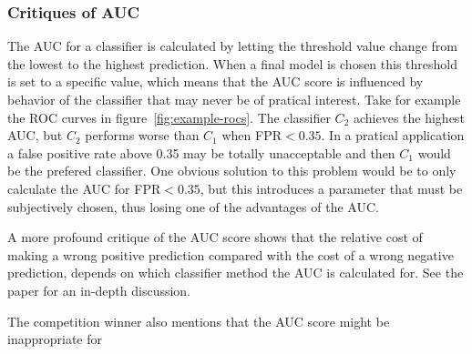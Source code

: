 \subsubsection{Critiques of AUC}\label{sec:auc-critique}
The AUC for a classifier is calculated by letting the threshold value change from the lowest to the highest prediction. When a final model is chosen this threshold is set to a specific value, which means that the AUC score is influenced by behavior of the classifier that may never be of pratical interest. Take for example the ROC curves in figure~\ref{fig:example-rocs}. The classifier $C_2$ achieves the highest AUC, but $C_2$ performs worse than $C_1$ when FPR$<0.35$. In a pratical application a false positive rate above 0.35 may be totally unacceptable and then $C_1$ would be the prefered classifier. One obvious solution to this problem would be to only calculate the AUC for FPR$<0.35$, but this introduces a parameter that must be subjectively chosen, thus losing one of the advantages of the AUC. \par
A more profound critique of the AUC score shows that the relative cost of making a wrong positive prediction compared with the cost of a wrong negative prediction, depends on which classifier method the AUC is calculated for. See the paper \citet{hand09} for an in-depth discussion. \par
The competition winner also mentions that the AUC score might be inappropriate for \TFC\ \citep[p.5]{inference_winning_approach}




